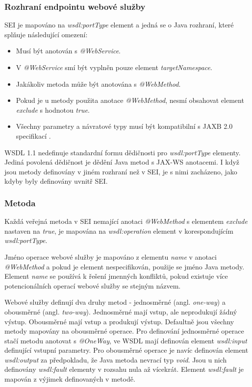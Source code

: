 \documentclass[11pt,twoside,a4paper]{book}
\begin{document}
\subsubsection{Rozhraní endpointu webové služby}
SEI je mapováno na {\em wsdl:portType} element a jedná se o Java
rozhraní, které splňuje následující omezení:

\begin{itemize}
  \item Musí být anotován s {\em @WebService}.
  \item V {\em @WebService} smí být vyplněn pouze element {\em targetNamespace}.
  \item Jakákoliv metoda může být anotována s {\em @WebMethod}.
  \item Pokud je u metody použita anotace {\em @WebMethod}, nesmí obsahovat
  element {\em exclude} s hodnotou {\em true}.
  \item Všechny parametry a návratové typy musí být kompatibilní s JAXB 2.0
  specifikací \cite{JAXB20}.
\end{itemize}

WSDL 1.1 nedefinuje standardní formu dědičnosti pro {\em wsdl:portType}
elementy.
Jediná povolená dědičnost je dědění Java metod s JAX-WS anotacemi. I když jsou metody
definovány v jiném rozhraní než v SEI, je s nimi zacházeno, jako kdyby byly
definovány uvnitř SEI.

\subsubsection{Metoda}

Každá veřejná metoda v SEI nemající anotaci {\em @WebMethod} s elementem {\em
exclude} nastaven na {\em true}, je mapována na {\em wsdl:operation} element v
korespondujícím {\em wsdl:portType}.

Jméno operace webové služby je mapováno z elementu {\em name} v anotaci {\em
@WebMethod} a pokud je element nespecifikován, použije se jméno Java metody.
Element {\em name} se používá k řešení jmenných konfliktů, pokud existuje více
potencionálních operací webové služby se stejným
názvem.

Webové služby definují dva druhy metod - jednosměrné (angl. {\em
one-way}) a obousměrné (angl. {\em two-way}).
Jednosměrné mají vstup, ale neprodukují žádný výstup. Obousměrné mají vstup a
produkují výstup. Defaultně jsou všechny metody mapovány na obousměrné operace.
Pro definování jednosměrné operace stačí metodu anotovat s {\em @OneWay}, ve
WSDL mají definován element {\em wsdl:input} definující vstupní parametry. Pro
obousměrné operace je navíc definován element {\em wsdl:output} za předpokladu, že Java metoda nevrací typ {\em void}.
Jsou u nich definovány {\em wsdl:fault} elementy v rozsahu nula až
vícekrát.
Element {\em wsdl:fault} je mapován z výjimek definovaných v metodě.
\end{document}
